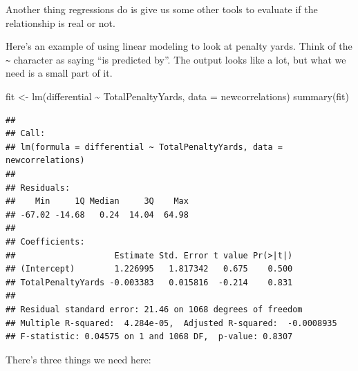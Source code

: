 \documentclass[
]{book}
\newenvironment{Shaded}{\begin{snugshade}}{\end{snugshade}}
\newcommand{\AttributeTok}[1]{\textcolor[rgb]{0.77,0.63,0.00}{#1}}
\newcommand{\FunctionTok}[1]{\textcolor[rgb]{0.00,0.00,0.00}{#1}}
\newcommand{\NormalTok}[1]{#1}
\newcommand{\OtherTok}[1]{\textcolor[rgb]{0.56,0.35,0.01}{#1}}
\newcommand{\SpecialCharTok}[1]{\textcolor[rgb]{0.00,0.00,0.00}{#1}}
\begin{document}
Another thing regressions do is give us some other tools to evaluate if the relationship is real or not.

Here's an example of using linear modeling to look at penalty yards. Think of the \texttt{\textasciitilde{}} character as saying ``is predicted by''. The output looks like a lot, but what we need is a small part of it.

\begin{Shaded}
\begin{Highlighting}[]
\NormalTok{fit }\OtherTok{\textless{}{-}} \FunctionTok{lm}\NormalTok{(differential }\SpecialCharTok{\textasciitilde{}}\NormalTok{ TotalPenaltyYards, }\AttributeTok{data =}\NormalTok{ newcorrelations)}
\FunctionTok{summary}\NormalTok{(fit)}
\end{Highlighting}
\end{Shaded}

\begin{verbatim}
## 
## Call:
## lm(formula = differential ~ TotalPenaltyYards, data = newcorrelations)
## 
## Residuals:
##    Min     1Q Median     3Q    Max 
## -67.02 -14.68   0.24  14.04  64.98 
## 
## Coefficients:
##                    Estimate Std. Error t value Pr(>|t|)
## (Intercept)        1.226995   1.817342   0.675    0.500
## TotalPenaltyYards -0.003383   0.015816  -0.214    0.831
## 
## Residual standard error: 21.46 on 1068 degrees of freedom
## Multiple R-squared:  4.284e-05,  Adjusted R-squared:  -0.0008935 
## F-statistic: 0.04575 on 1 and 1068 DF,  p-value: 0.8307
\end{verbatim}

There's three things we need here:
\end{document}
